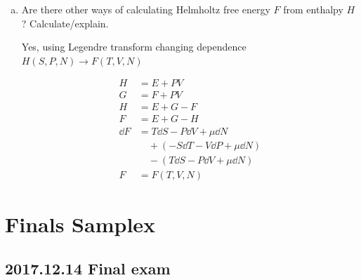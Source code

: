 \documentclass[9pt,a4paper,twocolumn]{article}
\begin{document}
\begin{enumerate}[1.]
\begin{enumerate}[(a)]
		\item Are there other ways of calculating Helmholtz free energy $F$ from enthalpy $H$? Calculate/explain.
		
		Yes, using Legendre transform changing dependence $H(S,P,N) \rightarrow F(T,V,N)$
		
		\begin{align}
			H &= E + PV \\
			G &= F + PV \\
			H &= E+G-F \\
			F &= E+G-H \\
			\dd{F} &= T\dd{S}-P\dd{V}+\mu\dd{N} \nonumber \\
			&\quad + (-S\dd{T} - V\dd{P} + \mu\dd{N}) \nonumber \\
			&\quad - (T\dd{S} - P\dd{V} + \mu\dd{N}) \\
			F &= F(T,V,N)
		\end{align}
	
	\end{enumerate}

\end{enumerate}

\section{Finals Samplex}

\subsection{2017.12.14 Final exam}
\end{document}
